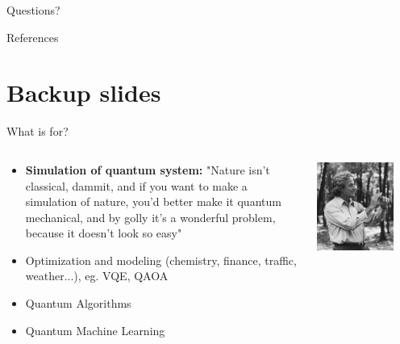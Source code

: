\documentclass[aspectratio=169,10pt]{beamer}
\begin{document}
\begin{frame}[t,standout]
\Large
Questions?
\end{frame}


\begin{frame}{References}
    \printbibliography
\end{frame}


\section*{Backup slides}

\begin{frame}{What is for?}
  \begin{columns}
    \begin{column}{0.5\textwidth}
      \begin{itemize}[label=\textbullet]
        \item \textbf{Simulation of quantum system:} "Nature isn't classical, dammit, and if you want to make a simulation of nature, you'd better make it quantum mechanical, and by golly it's a wonderful problem, because it doesn't look so easy"
        \item Optimization and modeling (chemistry, finance, traffic, weather...), eg. VQE, QAOA
        \item Quantum Algorithms 
        \item Quantum Machine Learning
      \end{itemize}
      \end{column}
      \begin{column}{0.5\textwidth}
        \begin{center}
            \includegraphics[width=0.8\textwidth]{figures/feynmann.jpg}
        \end{center}
      \end{column}
  \end{columns}
\end{frame}
\end{document}
